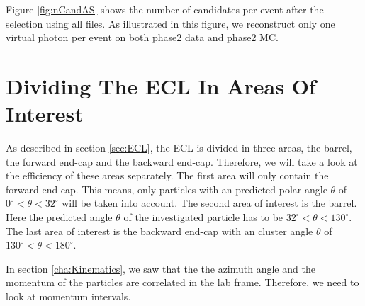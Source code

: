 \documentclass[a4paper,11pt,twosided,final,german,openbib,pdftex,listof=totoc,bibliography=totoc]{scrbook}
\begin{document}
Figure \ref{fig:nCandAS} shows the number of candidates per event after the selection using all files. As illustrated in this figure, we reconstruct only one virtual photon per event on both phase2 data and phase2 MC.


\section{Dividing The ECL In Areas Of Interest}
\label{sec:DivECL}

As described in section \ref{sec:ECL}, the ECL is divided in three areas, the barrel, the forward end-cap and the backward end-cap. Therefore, we will take a look at the efficiency of these areas separately. The first area will only contain the forward end-cap. This means, only particles with an predicted polar angle $\theta$ of $0^\circ <\theta<32^\circ$ will be taken into account. The second area of interest is the barrel. Here the predicted angle $\theta$ of the investigated particle has to be $32^\circ < \theta < 130^\circ$. The last area of interest is the backward end-cap with an cluster angle $\theta$ of $130^\circ <\theta < 180^\circ$.  

In section \ref{cha:Kinematics}, we saw that the the azimuth angle and the momentum of the particles are correlated in the lab frame. Therefore, we need to look at momentum intervals. 
\end{document}

